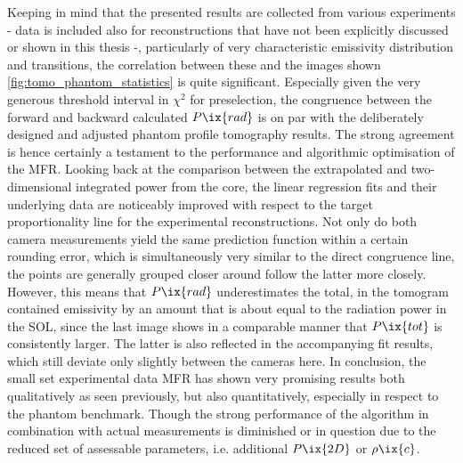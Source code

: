                 Keeping in mind that the presented results are collected from various experiments - data is included also for reconstructions that have not been explicitly discussed or shown in this thesis -, particularly of very characteristic emissivity distribution and transitions, the correlation between these and the images shown \cref{fig:tomo_phantom_statistics} is quite significant. Especially given the very generous threshold interval in $\chi^{2}$ for preselection, the congruence between the forward and backward calculated $P\ix{rad}$ is on par with the deliberately designed and adjusted phantom profile tomography results. The strong agreement is hence certainly a testament to the performance and algorithmic optimisation of the MFR. Looking back at the comparison between the extrapolated and two-dimensional integrated power from the core, the linear regression fits and their underlying data are noticeably improved with respect to the target proportionality line for the experimental reconstructions. Not only do both camera measurements yield the same prediction function within a certain rounding error, which is simultaneously very similar to the direct congruence line, the points are generally grouped closer around follow the latter more closely. However, this means that $P\ix{rad}$ underestimates the total, in the tomogram contained emissivity by an amount that is about equal to the radiation power in the SOL, since the last image shows in a comparable manner that $P\ix{tot}$ is consistently larger. The latter is also reflected in the accompanying fit results, which still deviate only slightly between the cameras here. In conclusion, the small set experimental data MFR has shown very promising results both qualitatively as seen previously, but also quantitatively, especially in respect to the phantom benchmark. Though the strong performance of the algorithm in combination with actual measurements is diminished or in question due to the reduced set of assessable parameters, i.e. additional $P\ix{2D}$ or $\rho\ix{c}$.%
%
